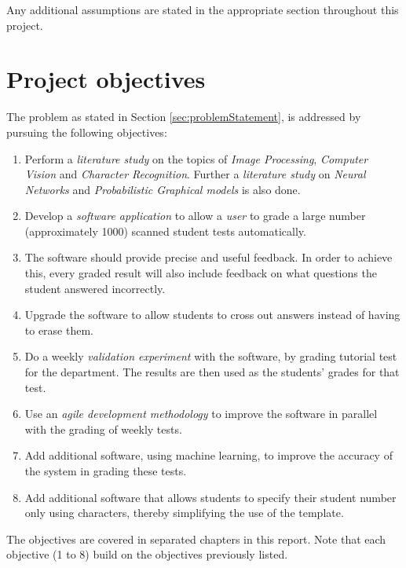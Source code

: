 Any additional assumptions are stated in the appropriate section throughout this project.


\section{Project objectives}
\label{sec:Objectives}

The problem as stated in Section \ref{sec:problemStatement}, is addressed by pursuing the following objectives:
\begin{enumerate}
  \item Perform a \textsl{literature study} on the topics of \textsl{Image Processing}, \textsl{Computer Vision} and \textsl{Character Recognition}. Further a \textsl{literature study} on \textsl{Neural Networks} and \textsl{Probabilistic Graphical models} is also done.
  \item Develop a \textsl{software application} to allow a \textsl{user} to grade a large number (approximately 1000) scanned student tests automatically.
\item The software should provide precise and useful feedback. In order to achieve this, every graded result will also include feedback on what questions the student answered incorrectly.
\item Upgrade the software to allow students to cross out answers instead of having to erase them.
  \item Do a weekly \textsl{validation experiment} with the software, by grading tutorial test for the department. The results are then used as the students' grades for that test.
  \item Use an \textsl{agile development methodology} to improve the software in parallel with the grading of weekly tests.
  \item Add additional software, using machine learning, to improve the accuracy of the system in grading these tests.
  \item Add additional software that allows students to specify their student number only using characters, thereby simplifying the use of the template.
\end{enumerate}
The objectives are covered in separated chapters in this report. Note that each objective (1 to 8) build on the objectives previously listed.


